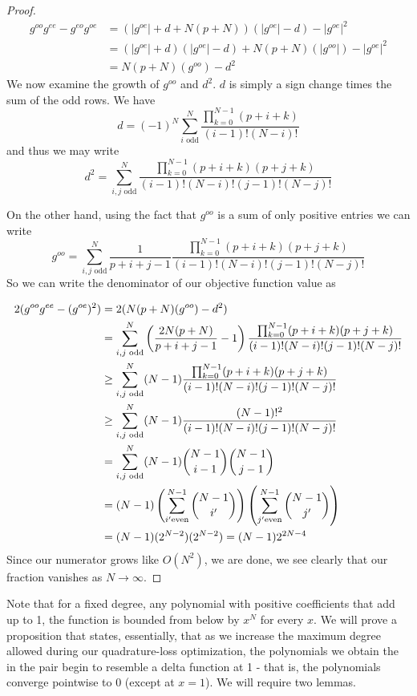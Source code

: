\documentclass{article}
\theoremstyle{definition}
\theoremstyle{remark}
\numberwithin{equation}{section}
\begin{document}
\begin{proof}
\begin{align*}
g^{oo} g^{ee} - g^{eo}g^{oe} &=  (|g^{oe}| + d + N(p+N)) (|g^{oe}| - d) - |g^{oe}|^2 \\
&= (|g^{oe}|+d)(|g^{oe}| - d) + N(p+N)(|g^{oo}|) - |g^{oe}|^2\\
&= N(p+N)(g^{oo}) - d^2
\end{align*}
We now examine the growth of $g^{oo}$ and $d^2$. $d$ is simply a sign change times the sum of the odd rows. We have
\[d = (-1)^N \sum_{i \text{ odd}}^N \frac{\prod_{k=0}^{N-1} (p+i+k)}{(i-1)!(N-i)!} \] 
and thus we may write 
\[d^2 = \sum_{i,j \text{ odd}}^N 
\frac{\prod_{k=0}^{N-1} (p+i+k)(p+j+k)}{(i-1)! (N-i)! (j-1)! (N-j)!} \]

On the other hand, using the fact that $g^{oo}$ is a sum of only positive entries we can write 
\[g^{oo} = \sum_{i,j \text{ odd}}^N \frac{1}{p+i+j-1} \frac{\prod_{k=0}^{N-1} (p+i+k)(p+j+k)}{(i-1)! (N-i)! (j-1)! (N-j)!}\]
So we can write the denominator of our objective function value as

\begin{align*} 2(g^{oo} g^{ee}-(g^{oe})^2) &= 2(N(p+N)(g^{oo}) - d^2)\\ &= \sum_{i,j \text{ odd}}^N \left( \frac{2N(p+N)}{p+i+j-1} - 1\right) \frac{\prod_{k=0}^{N-1} (p+i+k)(p+j+k)}{(i-1)! (N-i)! (j-1)! (N-j)!} \\
& \ge \sum_{i,j \text{ odd}}^N (N-1) \frac{\prod_{k=0}^{N-1} (p+i+k)(p+j+k)}{(i-1)! (N-i)! (j-1)! (N-j)!}\\
&\ge \sum_{i,j \text{ odd}}^N (N-1) \frac{(N-1)!^2}{(i-1)! (N-i)! (j-1)! (N-j)!} \\
&= \sum_{i,j \text{ odd}}^N (N-1) \dbinom{N-1}{i-1} \dbinom{N-1}{j-1}\\
&= (N-1) \left(\sum_{i' \text{even}}^{N-1} \dbinom{N-1}{i'}\right) \left( \sum_{j' \text{even}}^{N-1} \dbinom{N-1}{j'}\right)\\
&= (N-1)(2^{N-2})(2^{N-2}) = (N-1)2^{2N-4}
\end{align*} 
Since our numerator grows like $O(N^2)$, we are done, we see clearly that our fraction vanishes as $N \to \infty$. \end{proof}

Note that for a fixed degree, any polynomial with positive coefficients that add up to 1, the function is bounded from below by $x^N$ for every $x$. We will prove a proposition that states, essentially, that as we increase the maximum degree allowed during our quadrature-loss optimization, the polynomials we obtain the in the pair begin to resemble a delta function at 1 - that is, the polynomials converge pointwise to 0 (except at $x=1$). We will require two lemmas. 
\end{document}
